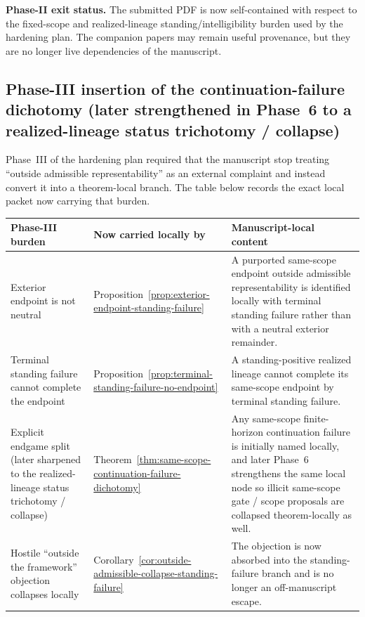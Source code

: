 \noindent\textbf{Phase-II exit status.} The submitted PDF is now self-contained with respect to the fixed-scope and realized-lineage standing/intelligibility burden used by the hardening plan. The companion papers may remain useful provenance, but they are no longer live dependencies of the manuscript.

\subsection*{Phase-III insertion of the continuation-failure dichotomy (later strengthened in Phase~6 to a realized-lineage status trichotomy / collapse)}
Phase~III of the hardening plan required that the manuscript stop treating ``outside admissible representability'' as an external complaint and instead convert it into a theorem-local branch. The table below records the exact local packet now carrying that burden.

\begin{center}
\footnotesize
\renewcommand{\arraystretch}{1.16}
\setlength{\tabcolsep}{4pt}
\begin{tabularx}{0.98\textwidth}{@{}L{0.31\textwidth}L{0.24\textwidth}Y@{}}
\toprule
\textbf{Phase-III burden} & \textbf{Now carried locally by} & \textbf{Manuscript-local content}\\
\midrule
Exterior endpoint is not neutral & Proposition~\ref{prop:exterior-endpoint-standing-failure} & A purported same-scope endpoint outside admissible representability is identified locally with terminal standing failure rather than with a neutral exterior remainder.\\
Terminal standing failure cannot complete the endpoint & Proposition~\ref{prop:terminal-standing-failure-no-endpoint} & A standing-positive realized lineage cannot complete its same-scope endpoint by terminal standing failure.\\
Explicit endgame split (later sharpened to the realized-lineage status trichotomy / collapse) & Theorem~\ref{thm:same-scope-continuation-failure-dichotomy} & Any same-scope finite-horizon continuation failure is initially named locally, and later Phase~6 strengthens the same local node so illicit same-scope gate / scope proposals are collapsed theorem-locally as well.\\
Hostile ``outside the framework'' objection collapses locally & Corollary~\ref{cor:outside-admissible-collapse-standing-failure} & The objection is now absorbed into the standing-failure branch and is no longer an off-manuscript escape.\\
\bottomrule
\end{tabularx}
\end{center}

